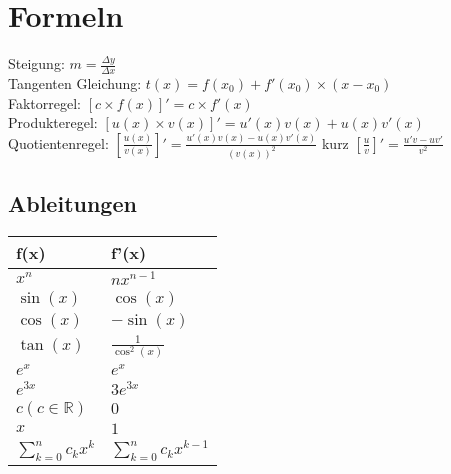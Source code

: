 \documentclass[../main.tex]{subfiles}
\begin{document}
\section{Formeln}
Steigung: $m = \frac{\Delta y}{\Delta x}$ \\ [7pt]
Tangenten Gleichung: $t(x) = f(x_0) + f'(x_0) \times (x - x_0)$ \\ [7pt]
Faktorregel: $[c \times f(x)]' = c \times f'(x)$ \\ [7pt]
Produkteregel: $[u(x) \times v(x)]' = u'(x)v(x) + u(x)v'(x)$ \\ [7pt]
Quotientenregel: $[\frac{u(x)}{v(x)}]' = \frac{u'(x)v(x) - u(x)v'(x)}{(v(x))^2}$ kurz $[\frac{u}{v}]'=\frac{u'v - uv'}{v^2}$

\subsection{Ableitungen}
\label{sec:Ableitungen}
\begin{tabularx}{0.5\textwidth} { 
    >{\centering\arraybackslash}X 
    >{\centering\arraybackslash}X  }
    \hline
    f(x) & f'(x) \\ [7pt]
    \hline
    $x^n$ & $nx^{n-1}$
    \\ [7pt]
    $\sin(x)$ & $\cos(x)$
    \\ [7pt]
    $\cos(x)$ & $-\sin(x)$
    \\ [7pt]
    $\tan(x)$ & $\frac{1}{\cos^2(x)}$
    \\ [7pt]
    $e^x$ & $e^x$
    \\ [7pt]
    $e^{3x}$ & $3e^{3x}$
    \\ [7pt]
    $c (c \in \mathbb{R})$ & $0$
    \\ [7pt]
    $x$ & $1$
    \\ [7pt]
    $\sum\limits_{k=0}^n c_kx^k$ & $\sum\limits_{k=0}^n c_kx^{k-1}$
\end{tabularx}
\end{document}
